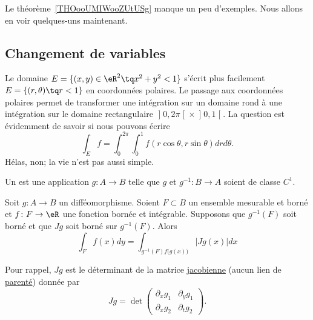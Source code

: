 Le théorème~\ref{THOooUMIWooZUtUSg} manque un peu d'exemples. Nous allons en voir quelques-uns maintenant.

\subsection{Changement de variables}

Le domaine $E=\{ (x,y)\in\eR^2\tq x^2+y^2<1 \}$ s'écrit plus facilement $E=\{ (r,\theta)\tq r<1 \}$ en coordonnées polaires. Le passage aux coordonnées polaires permet de transformer une intégration sur un domaine rond à une intégration sur le domaine rectangulaire $\mathopen]0,2\pi\mathclose[\times\mathopen]0,1\mathclose[$. La question est évidemment de savoir si nous pouvons écrire
\begin{equation}
    \int_Ef=\int_{0}^{2\pi}\int_0^1f(r\cos\theta,r\sin\theta)drd\theta.
\end{equation}
Hélas, non; la vie n'est pas aussi simple.

\begin{definition}
    Un  est une application $g\colon A\to B$ telle que $g$ et $g^{-1}\colon B\to A$ soient de classe $C^1$.
\end{definition}

\begin{theorem}
Soit $g\colon A\to B$ un difféomorphisme. Soient $F\subset B$ un ensemble mesurable et borné et $f\colon F\to \eR$ une fonction bornée et intégrable. Supposons que $g^{-1}(F)$ soit borné et que $Jg$ soit borné sur $g^{-1}(F)$. Alors
\begin{equation}
	\int_Ff(x)dy=\int_{g^{-1}(F)f\big( g(x) \big)}| Jg(x) |dx
\end{equation}
\end{theorem}
Pour rappel, $Jg$ est le déterminant de la matrice \href{http://fr.wikipedia.org/wiki/Matrice_jacobienne}{jacobienne} (aucun lien de \href{http://fr.wikipedia.org/wiki/Jacob}{parenté}) donnée par
\begin{equation}
	Jg=\det\begin{pmatrix}
	\partial_xg_1	&	\partial_yg_1	\\
	\partial_xg_2	&	\partial_tg_2
\end{pmatrix}.
\end{equation}

